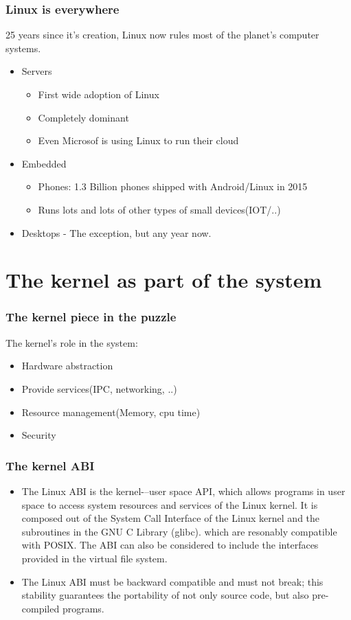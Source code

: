 \documentclass{beamer}
\begin{document}
\begin{frame}
\frametitle{Linux is everywhere}
25 years since it's creation, Linux now rules most of the planet's computer systems. \\
\begin{itemize}
	\item Servers
	\begin{itemize}
		\item First wide adoption of Linux
		\item Completely dominant
		\item Even Microsof is using Linux to run their cloud
	\end{itemize}
	\item Embedded 
	\begin{itemize}
		\item Phones: 1.3 Billion phones shipped with Android/Linux in 2015
		\item Runs lots and lots of other types of small devices(IOT/..)
	\end{itemize}
	\item Desktops - The exception, but any year now. 
\end{itemize}

\end{frame}

\section{The kernel as part of the system}

\begin{frame}
\frametitle{The kernel piece in the puzzle}
The kernel's role in the system: \\
\begin{itemize}
	\item Hardware abstraction
	\item Provide services(IPC, networking, ..)
	\item Resource management(Memory, cpu time)
	\item Security
\end{itemize}
\end{frame}

\begin{frame}
\frametitle{The kernel ABI}
\begin{itemize}
	\item The Linux ABI is the kernel-–user space API, which allows programs in user space to access system resources and services of the Linux kernel. It is composed out of the System Call Interface of the Linux kernel and the subroutines in the GNU C Library (glibc). which are resonably compatible with POSIX. 
The ABI can also be considered to include the interfaces provided in the virtual file system. 

	\item The Linux ABI must be backward compatible and must not break; this stability guarantees the portability of not only source code, but also pre-compiled programs. 
\end{itemize}
\end{frame}
\end{document}
